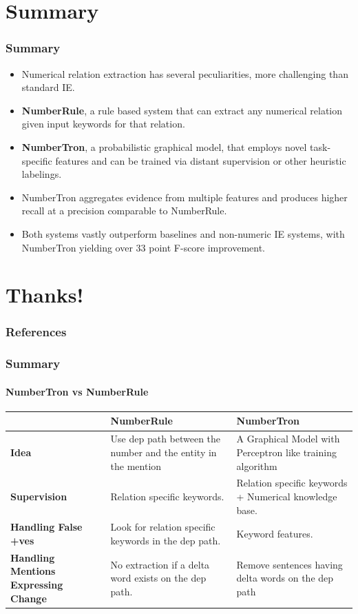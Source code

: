 \documentclass{beamer}
\begin{document}

\section{Summary}
\begin{frame}
\frametitle{Summary}
\begin{itemize} 
\item  Numerical relation extraction has several peculiarities, more challenging than standard IE.
\item \textbf{NumberRule}, a rule based system that can extract any numerical relation given input keywords for that relation.
\item \textbf{NumberTron}, a probabilistic graphical model, that employs novel task-specific features and can be trained via distant supervision or other heuristic labelings. 
\item NumberTron aggregates evidence from multiple features and produces higher recall at a precision comparable to NumberRule. 
\item Both systems vastly outperform baselines and non-numeric IE systems, with NumberTron yielding over 33 point F-score improvement.
\end{itemize}
    
\end{frame}

\section{Thanks!}
\begin{frame}[allowframebreaks]
        \frametitle{References}
        
        
\end{frame}

\begin{frame}
\frametitle{Summary}
\framesubtitle{NumberTron vs NumberRule}
\begin{tabularx}{\textwidth}{|b |b |b |}
\hline
  & \textbf{NumberRule} &  \textbf{NumberTron}\\ \hline
 \textbf{Idea} & Use dep path between the number and the entity in the mention& A Graphical Model with Perceptron like training algorithm\\ \hline
 \textbf{Supervision}& Relation specific keywords. & Relation specific keywords + Numerical knowledge base. \\ \hline
 \textbf{Handling False +ves}&  Look for relation specific keywords in the dep path.&  Keyword features. \\ \hline
\textbf{Handling Mentions Expressing Change}& No extraction if a delta word exists on the dep path. &  Remove sentences having delta words on the dep path\\ \hline 

 \end{tabularx}
\end{frame}
\end{document}

